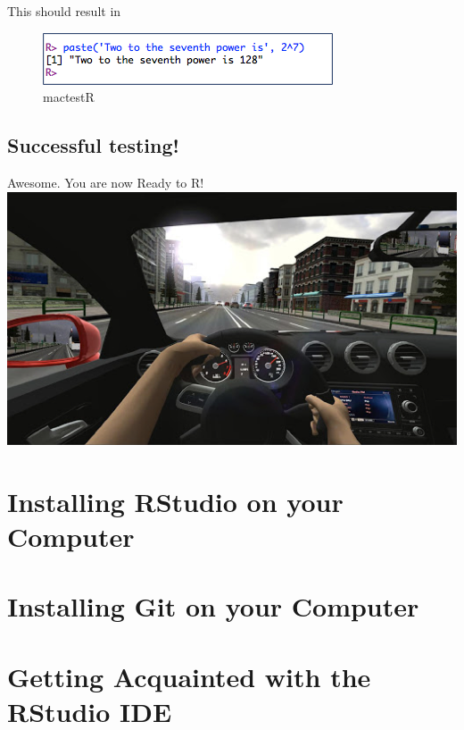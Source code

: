 \documentclass[
]{book}
\begin{document}
This should result in

\begin{figure}
\centering
\includegraphics{images/mactestR.png}
\caption{mactestR}
\end{figure}

\hypertarget{successful-testing}{%
\subsection{Successful testing!}\label{successful-testing}}

Awesome. You are now Ready to R!
\includegraphics{images/ready2R.png}

\hypertarget{installing-rstudio-on-your-computer}{%
\section{Installing RStudio on your Computer}\label{installing-rstudio-on-your-computer}}

\hypertarget{installing-git-on-your-computer}{%
\section{Installing Git on your Computer}\label{installing-git-on-your-computer}}

\hypertarget{getting-acquainted-with-the-rstudio-ide}{%
\section{Getting Acquainted with the RStudio IDE}\label{getting-acquainted-with-the-rstudio-ide}}
\end{document}
